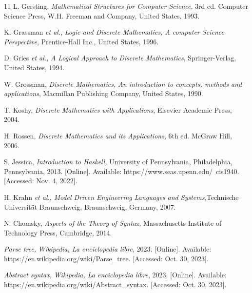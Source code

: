 \begin{thebibliography}{11}
    \label{sec:69}
    \hypertarget{69}{}
    L. Gersting, \textit{Mathematical Structures for Computer Science}, 3rd ed. Computer Science Press, W.H. Freeman and Company,  United States, 1993.

    \label{sec:70}
    \hypertarget{70}{}
    K. Grassman \textit{et al.}, \textit{Logic and Discrete Mathematics, A computer Science Perspective}, Prentice-Hall Inc., United States, 1996.

    \label{sec:71}
    \hypertarget{71}{}
    D. Gries \textit{et al.}, \textit{A Logical Approach to Discrete Mathematics}, Springer-Verlag,  United States, 1994.

    \label{sec:72}
    \hypertarget{72}{}
    W. Grossman, \textit{Discrete Mathematics, An introduction to concepts, methods and applications}, Macmillan Publishing Company,  United States, 1990.

    \label{sec:73}
    \hypertarget{73}{}
    T. Koshy, \textit{Discrete Mathematics with Applications}, Elsevier Academic Press, 2004.

    \label{sec:74}
    \hypertarget{74}{}
    H. Rossen, \textit{Discrete Mathematics and its Applications}, 6th ed. McGraw Hill, 2006.

    \label{sec:75}
    \hypertarget{75}{}
    S. Jessica, \textit{Introduction to Haskell, }University of Pennsylvania, Philadelphia, Pennsylvania, 2013. [Online]. Available: https://www.seas.upenn.edu/~cis1940. [Accessed: Nov. 4, 2022].

    \label{sec:76}
    \hypertarget{76}{}
    H. Krahn \textit{et al.}, \textit{Model Driven Engineering Languages and Systems,}Technische Universität Braunschweig, Braunschweig, Germany, 2007.

    \label{sec:77}
    \hypertarget{77}{}
    N. Chomsky, \textit{Aspects of the Theory of Syntax}, Massachusetts Institute of Technology Press, Cambridge, 2014.
    
    \label{sec:78}
    \hypertarget{78}{}
    \textit{Parse tree, }\textit{Wikipedia, La enciclopedia libre}, 2023. [Online]. Available: https://en.wikipedia.org/wiki/Parse\_tree. [Accessed: Oct. 30, 2023].

    \label{sec:79}
    \hypertarget{79}{}
    \textit{Abstract syntax, }\textit{Wikipedia, La enciclopedia libre}, 2023. [Online]. Available: https://en.wikipedia.org/wiki/Abstract\_syntax. [Accessed: Oct. 30, 2023].


\end{thebibliography}
